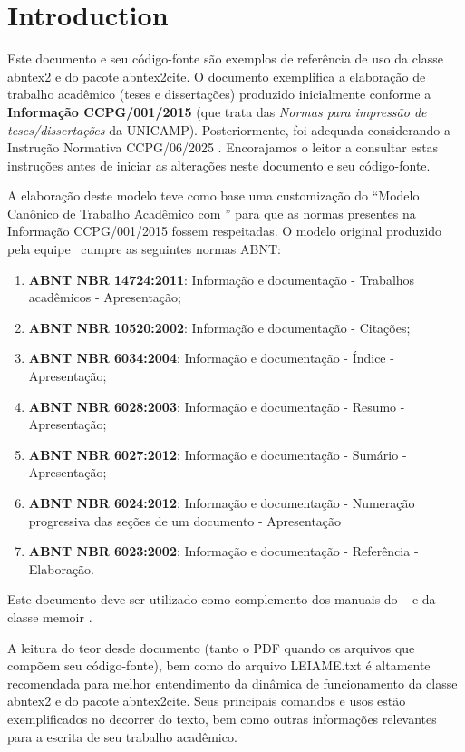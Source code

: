 \chapter*[Introduction]{Introduction}

Este documento e seu código-fonte são exemplos de referência de uso da classe
\textsf{abntex2} e do pacote \textsf{abntex2cite}. O documento exemplifica a elaboração
de trabalho acadêmico (teses e dissertações) produzido inicialmente conforme a \textbf{Informação
CCPG/001/2015} (que trata das \emph{Normas para impressão de teses/dissertações} da
UNICAMP). Posteriormente, foi adequada considerando a Instrução Normativa  CCPG/06/2025 \cite{CCPG:006:2025}. Encorajamos o leitor a consultar estas instruções
antes de iniciar as alterações neste documento e seu código-fonte.

A elaboração deste modelo teve como base uma customização do ``Modelo Canônico de
Trabalho Acadêmico com \abnTeX'' \cite{abntex2modelo} para que as normas presentes na
Informação CCPG/001/2015 fossem respeitadas. O modelo original produzido pela equipe
\abnTeX\ cumpre as seguintes normas ABNT:
\begin{enumerate}
 \item \textbf{ABNT NBR 14724:2011}: Informação e documentação - Trabalhos
    acadêmicos - Apresentação;
 \item \textbf{ABNT NBR 10520:2002}: Informação e documentação - Citações;
 \item \textbf{ABNT NBR 6034:2004}: Informação e documentação - Índice - Apresentação;
 \item \textbf{ABNT NBR 6028:2003}: Informação e documentação - Resumo - Apresentação;
 \item \textbf{ABNT NBR 6027:2012}: Informação e documentação - Sumário - Apresentação;
 \item \textbf{ABNT NBR 6024:2012}: Informação e documentação - Numeração progressiva
    das seções de um documento - Apresentação
 \item \textbf{ABNT NBR 6023:2002}: Informação e documentação - Referência - Elaboração.
\end{enumerate}

Este documento deve ser utilizado como complemento dos manuais do \abnTeX\
\cite{abntex2classe,abntex2cite,abntex2cite-alf} e da classe \textsf{memoir} \cite{memoir}.

A leitura do teor desde documento (tanto o PDF quando os arquivos que compõem seu código-fonte),
bem como do arquivo \textsf{LEIAME.txt} é altamente recomendada para melhor entendimento da
dinâmica de funcionamento da classe \textsf{abntex2} e do pacote \textsf{abntex2cite}. Seus
principais comandos e usos estão exemplificados no decorrer do texto, bem como outras informações
relevantes para a escrita de seu trabalho acadêmico.
